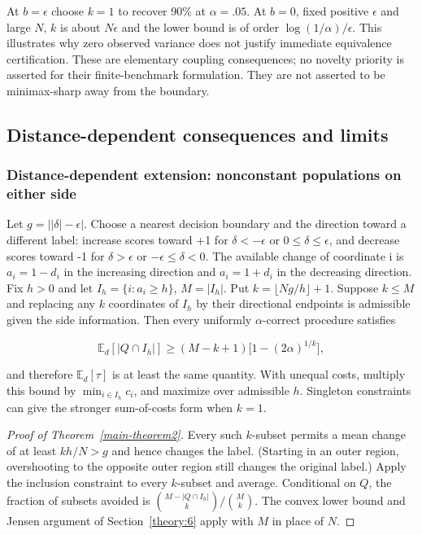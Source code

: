 At \(b=\epsilon\) choose \(k=1\) to recover 90\% at \(\alpha=.05\). At \(b=0\), fixed positive \(\epsilon\) and large \(N\), \(k\) is about \(N\epsilon\) and the lower bound is of order \(\log(1/\alpha)/\epsilon\). This illustrates why zero observed variance does not justify immediate equivalence certification. These are elementary coupling consequences; no novelty priority is asserted for their finite-benchmark formulation. They are not asserted to be minimax-sharp away from the boundary.

\subsection{Distance-dependent consequences and limits}\label{theory:7}

\subsubsection{Distance-dependent extension: nonconstant populations on either side}\label{distance-dependent-extension-nonconstant-populations-on-either-side}

Let \(g=\bigl||\delta|-\epsilon\bigr|\). Choose a nearest decision boundary and the direction toward a different label: increase scores toward +1 for \(\delta<-\epsilon\) or \(0\le\delta\le\epsilon\), and decrease scores toward -1 for \(\delta>\epsilon\) or \(-\epsilon\le\delta<0\). The available change of coordinate i is \(a_i=1-d_i\) in the increasing direction and \(a_i=1+d_i\) in the decreasing direction. Fix \(h>0\) and let \(I_h=\{i:a_i\ge h\}\), \(M=|I_h|\). Put \(k=\lfloor Ng/h\rfloor+1\). Suppose \(k\le M\) and replacing any \(k\) coordinates of \(I_h\) by their directional endpoints is admissible given the side information. Then every uniformly \(\alpha\)-correct procedure satisfies

\begin{equation}\label{eq:proofs-9}
\mathbb E_d[|Q\cap I_h|]\ge(M-k+1)\bigl[1-(2\alpha)^{1/k}\bigr],
\end{equation}

and therefore \(\mathbb E_d[\tau]\) is at least the same quantity. With unequal costs, multiply this bound by \(\min_{i\in I_h}c_i\), and maximize over admissible \(h\). Singleton constraints can give the stronger sum-of-costs form when \(k=1\).

\begin{proof}[Proof of Theorem~\ref{main-theorem2}] Every such \(k\)-subset permits a mean change of at least \(kh/N>g\) and hence changes the label. (Starting in an outer region, overshooting to the opposite outer region still changes the original label.) Apply the inclusion constraint to every \(k\)-subset and average. Conditional on \(Q\), the fraction of subsets avoided is \(\binom{M-|Q\cap I_h|}{k}/\binom Mk\). The convex lower bound and Jensen argument of Section~\ref{theory:6} apply with \(M\) in place of \(N\). \end{proof}

